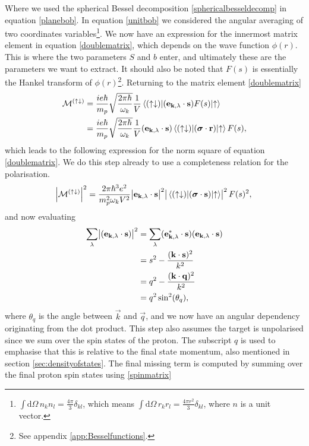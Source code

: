 Where we used the spherical Bessel decomposition \eqref{sphericalbesseldecomp} in equation \eqref{planebob}. In equation \eqref{unitbob} we considered the angular averaging of two coordinates variables\footnote{$\int \text{d}\Omega \, n_k n_l =\frac{4\pi}{3}\delta_{kl}$, which means $\int \text{d}\Omega \, r_k r_l =\frac{4\pi r^2}{3}\delta_{kl}$, where $n$ is a unit vector.}.
We now have an expression for the innermost matrix element in equation \eqref{doublematrix}, which depends on the wave function $\phi(r)$. This is where the two parameters $S$ and $b$ enter, and ultimately these are the parameters we want to extract. It should also be noted that $F(s)$ is essentially the Hankel transform of $\phi(r)$\footnote{See appendix \ref{app:Besselfunctions}.}. Returning to the matrix element \eqref{doublematrix}
\begin{align}
	\mathcal{M^{(\uparrow\downarrow)}} &= \frac{ie\hbar}{m_p}\sqrt{\frac{2\pi \hbar}{\omega_k}}\frac{1}{V}\mel*{(\uparrow\downarrow)}{(\bm{\mathrm{e}}_{\bm{\mathrm{k}},\lambda}\cdot\bm{\mathrm{s}})F(s)}{\uparrow} \\
	&=\frac{ie\hbar}{m_p}\sqrt{\frac{2\pi \hbar}{\omega_k}}\frac{1}{V} (\bm{\mathrm{e}}_{\bm{\mathrm{k}},\lambda}\cdot\bm{\mathrm{s}})\mel*{(\uparrow\downarrow)}{(\bm{\mathrm{\sigma}}\cdot \bm{\mathrm{r}})}{\uparrow}F(s),
\end{align}
which leads to the following expression for the norm square of equation \eqref{doublematrix}. We do this step already to use a completeness relation for the polarisation.
\begin{equation} \label{matrixspinupdownabs}
	\abs{\mathcal{M}^{(\uparrow\downarrow)}}^2 = \frac{2\pi\hbar^3e^2}{m_p^2\omega_k V^2} \abs{\bm{\mathrm{e}}_{\bm{\mathrm{k}},\lambda}\cdot \bm{\mathrm{s}}}^2 \abs{\mel*{(\uparrow\downarrow)}{(\bm{\mathrm{\sigma}}\cdot \bm{\mathrm{s}})}{\uparrow}}^2 F(s)^2,
\end{equation}
and now evaluating
\begin{align} \label{sumoverpol}
	\sum_\lambda \abs{(\bm{\mathrm{e}}_{\bm{\mathrm{k}},\lambda} \cdot \bm{\mathrm{s}})}^2 &= \sum_\lambda (\bm{\mathrm{e}}_{\bm{\mathrm{k}},\lambda}^*\cdot \bm{\mathrm{s}})(\bm{\mathrm{e}}_{\bm{\mathrm{k}},\lambda}\cdot\bm{\mathrm{s}}) \\
	&= s^2 -\frac{(\bm{\mathrm{k}}\cdot \bm{\mathrm{s}})^2}{k^2} \\
	&= q^2 -\frac{(\bm{\mathrm{k}}\cdot \bm{\mathrm{q}})^2}{k^2} \\
	&= q^2 \sin^2(\theta_q),\label{finalsum}
\end{align}
where $\theta_q$ is the angle between $\vec{k}$ and $\vec{q}$, and we now have an angular dependency originating from the dot product. This step also assumes the target is unpolarised since we sum over the spin states of the proton. The subscript $q$ is used to emphasise that this is relative to the final state momentum, also mentioned in section \ref{sec:densityofstates}. The final missing term is computed by summing over the final proton spin states using \eqref{spinmatrix}
